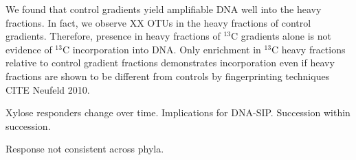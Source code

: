 We found that control gradients yield amplifiable DNA well into the heavy
fractions. In fact, we observe XX OTUs in the heavy fractions of control
gradients. Therefore, presence in heavy fractions of $^{13}$C gradients alone
is not evidence of $^{13}$C incorporation into DNA. Only enrichment in
$^{13}$C heavy fractions relative to control gradient fractions demonstrates
incorporation even if heavy fractions are shown to be different from controls
by fingerprinting techniques CITE Neufeld 2010.

Xylose responders change over time. Implications for DNA-SIP. Succession within
succession.

Response not consistent across phyla.

















